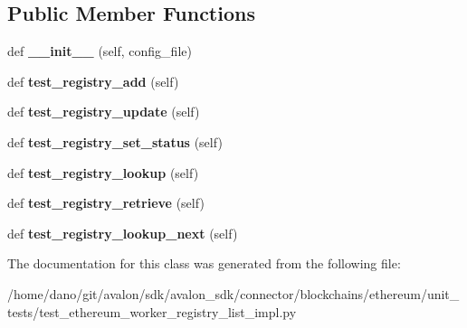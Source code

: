 \subsection*{Public Member Functions}
\begin{DoxyCompactItemize}
\item 
\mbox{\label{classtest__ethereum__worker__registry__list__impl_1_1TestEthereumWorkerRegistryListImpl_a9feba6c5ddb5a4627981cf278b257d03}} 
def {\bfseries \+\_\+\+\_\+init\+\_\+\+\_\+} (self, config\+\_\+file)
\item 
\mbox{\label{classtest__ethereum__worker__registry__list__impl_1_1TestEthereumWorkerRegistryListImpl_a884cae2be94fed8a898eb804ff4d8b19}} 
def {\bfseries test\+\_\+registry\+\_\+add} (self)
\item 
\mbox{\label{classtest__ethereum__worker__registry__list__impl_1_1TestEthereumWorkerRegistryListImpl_ab66d71797d3d950c391e56196e529766}} 
def {\bfseries test\+\_\+registry\+\_\+update} (self)
\item 
\mbox{\label{classtest__ethereum__worker__registry__list__impl_1_1TestEthereumWorkerRegistryListImpl_a5b78b373b72afe52282cb57b60c44bbe}} 
def {\bfseries test\+\_\+registry\+\_\+set\+\_\+status} (self)
\item 
\mbox{\label{classtest__ethereum__worker__registry__list__impl_1_1TestEthereumWorkerRegistryListImpl_a8f0862307c21e59bd24fc6ed33f3437f}} 
def {\bfseries test\+\_\+registry\+\_\+lookup} (self)
\item 
\mbox{\label{classtest__ethereum__worker__registry__list__impl_1_1TestEthereumWorkerRegistryListImpl_aeb84bf34b277ee06db42bffa6a1491f4}} 
def {\bfseries test\+\_\+registry\+\_\+retrieve} (self)
\item 
\mbox{\label{classtest__ethereum__worker__registry__list__impl_1_1TestEthereumWorkerRegistryListImpl_ab827fd8906f2c42b6158e20d62c58d6b}} 
def {\bfseries test\+\_\+registry\+\_\+lookup\+\_\+next} (self)
\end{DoxyCompactItemize}


The documentation for this class was generated from the following file\+:\begin{DoxyCompactItemize}
\item 
/home/dano/git/avalon/sdk/avalon\+\_\+sdk/connector/blockchains/ethereum/unit\+\_\+tests/test\+\_\+ethereum\+\_\+worker\+\_\+registry\+\_\+list\+\_\+impl.\+py\end{DoxyCompactItemize}
